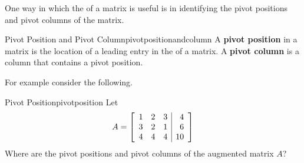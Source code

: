One way in which the \ef \;of a matrix is useful is in identifying the pivot positions and pivot columns of the matrix.

\begin{definition}{Pivot Position and Pivot Column}{pivotpositionandcolumn}
A \textbf{pivot position}
in a matrix is the location of a leading entry in the \ef of a matrix.
A \textbf{pivot column}
 is a column that contains a pivot position.
\end{definition}

For example consider the following.

\begin{example}{Pivot Position}{pivotposition}
Let
\begin{equation*}
A=\left[
\begin{array}{rrr|r}
1 & 2 & 3 & 4 \\
3 & 2 & 1 & 6 \\
4 & 4 & 4 & 10
\end{array}
\right]
\end{equation*}
Where are the pivot positions
and pivot columns of the augmented matrix $A$?
\end{example}

